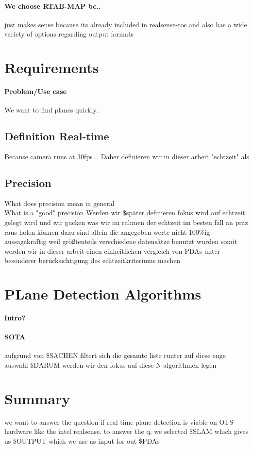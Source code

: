 \documentclass[main.tex]{subfiles}
\begin{document}
\paragraph*{We choose RTAB-MAP bc..}
just makes sense because its already included in realsense-ros and also has a wide variety of
options regarding output formats
\section{Requirements}

\paragraph*{Problem/Use case}
We want to find planes quickly..

\subsection*{Definition Real-time}
Because camera runs at 30fps ..
Daher definieren wir in dieser arbeit "echtzeit" als

\subsection*{Precision}
What does precision mean in general \\
What is a "good" precision
Werden wir \$später definieren
fokus wird auf echtzeit gelegt wird und wir gucken was wir im rahmen der echtzeit im besten fall an präz raus holen können
dazu sind allein die angegeben werte nicht 100\%ig aussagekräftig weil größtenteils verschiedene datensätze benutzt wurden
somit werden wir in dieser arbeit einen einheitlichen vergleich von PDAs unter besonderer berücksichtigung des echtzeitkriteriums machen


\section{PLane Detection Algorithms}
\paragraph*{Intro?}
\paragraph*{SOTA}
aufgrund von \$SACHEN filtert sich die gesamte liste runter auf diese enge auswahl
\$DARUM werden wir den fokus auf diese N algorithmen legen
\section{Summary}
we want to answer the question if real time plane detection is viable on OTS hardware like the intel realsense.
to answer the q, we selected  \$SLAM which gives us \$OUTPUT which we use as input for out \$PDAs
\end{document}
